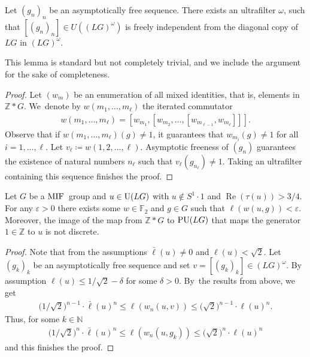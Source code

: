 \begin{Lemma}
Let $(g_n)_n$ be an asymptotically free sequence. There exists an ultrafilter $\omega$, such that $[(g_n)_n] \in U((LG)^{\omega})$ is freely independent from the diagonal copy of $LG$ in $(LG)^\omega$.
\end{Lemma}
This lemma is standard but not completely trivial, and we include the argument for the sake of completeness.
\begin{proof}
Let $(w_m)$ be an enumeration of all mixed identities, that is, elements in $\mathbb Z\ast G$. We~denote by $w(m_1,\dots,m_\ell)$ the iterated commutator
\begin{gather*}
w(m_1,\dots,m_\ell) = [w_{m_1},[w_{m_2},\dots, [w_{m_{\ell-1}},w_{m_\ell}]]].
\end{gather*}
Observe that if $w(m_1,\dots,m_\ell)(g) \neq 1$, it guarantees that $w_{m_i}(g)\neq 1$ for all $i=1,\dots,\ell$. Let $v_\ell\coloneqq w(1,2,\dots,\ell)$. Asymptotic freeness of $(g_n)$ guarantees the existence of natural numbers $n_\ell$ such that $v_\ell(g_{n_\ell})\neq 1$. Taking an ultrafilter containing this sequence finishes the proof.
\end{proof}

\begin{Lemma}
Let $G$ be a ${\rm MIF}$~group and $u \in {\rm U}(LG)$ with $u \not \in S^1 \cdot 1$ and $\operatorname{Re}(\tau(u))>3/4$. For any $\varepsilon>0$ there exists some $w \in \mathbb F_2$ and $g \in G$ such that $\ell(w(u,g))< \varepsilon$. Moreover, the image of the map from $\mathbb Z \ast G$ to ${\rm PU}(LG)$ that maps the generator $1 \in \mathbb Z$ to $u$ is not discrete.
\end{Lemma}
\begin{proof}
Note that from the assumptions $\bar \ell(u) \neq 0$ and $\ell(u)< \sqrt{2}$.
Let $(g_k)_k$ be an asymptotically free sequence and set $v= [(g_k)_k] \in (LG)^{\omega}$. By assumption $\ell(u) \leq 1/\sqrt{2} - \delta$ for some $\delta>0$. By~the results from above, we get
\begin{gather*}
\big(1/\sqrt{2}\big)^{n-1} \cdot \bar\ell(u)^n \leq \ell(w_n(u,v)) \leq\big(\sqrt{2}\big)^{n-1} \cdot \ell(u)^n.
\end{gather*}
Thus, for some $k \in \mathbb N$
\begin{gather*}
\big(1/\sqrt{2}\big)^{n} \cdot \bar\ell(u)^n \leq \ell(w_n(u,g_k)) \leq \big(\sqrt{2}\big)^{n} \cdot \ell(u)^n
\end{gather*}
and this finishes the proof.
\end{proof}

